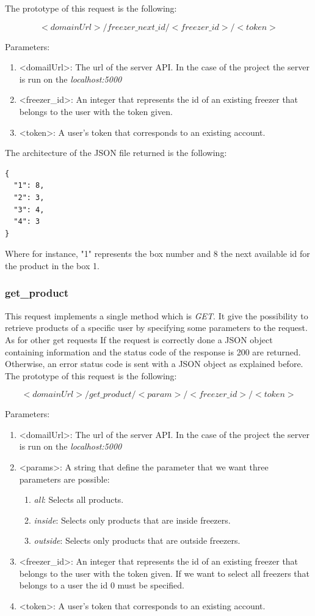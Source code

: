 The prototype of this request is the following:

$$<domainUrl>/freezer\_next\_id/<freezer\_id>/<token>$$

Parameters:
\begin{enumerate}
\item <domailUrl>: The url of the server API. In the case of the project the server is run on the \textit{localhost:5000}
\item <freezer\_id>: An integer that represents the id of an existing freezer that belongs to the user with the token given.
\item <token>: A user's token that corresponds to an existing account.
\end{enumerate}

The architecture of the JSON file returned is the following:
\begin{lstlisting}
{
  "1": 8, 
  "2": 3, 
  "3": 4, 
  "4": 3
}
\end{lstlisting}
Where for instance, "1" represents the box number and 8 the next available id for the product in the box 1.

\subsubsection{get\_product}
This request implements a single method which is \textit{GET}. It give the possibility to retrieve products of a specific user by specifying some parameters to the request. As for other get requests If the request is correctly done a JSON object containing information and the status code of the response is 200 are returned. Otherwise, an error status code is sent with a JSON object as explained before.\\

The prototype of this request is the following:

$$<domainUrl>/get\_product/<param>/<freezer\_id>/<token>$$

Parameters:
\begin{enumerate}
\item <domailUrl>: The url of the server API. In the case of the project the server is run on the \textit{localhost:5000}
\item <params>: A string that define the parameter that we want three parameters are possible:
\begin{enumerate}
\item \textit{all}: Selects all products.
\item \textit{inside}: Selects only products that are inside freezers.
\item \textit{outside}: Selects only products that are outside freezers.
\end{enumerate}
\item <freezer\_id>: An integer that represents the id of an existing freezer that belongs to the user with the token given. If we want to select all freezers that belongs to a user the id 0 must be specified.
\item <token>: A user's token that corresponds to an existing account.
\end{enumerate}

